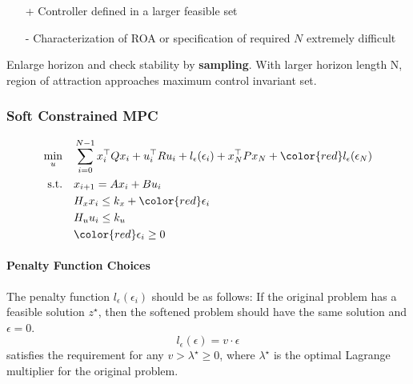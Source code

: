 \newpar{}

\begin{itemize}
    \item [+] Controller defined in a larger feasible set
    \item [-] Characterization of ROA or specification of required $N$ extremely difficult
\end{itemize}

\newpar{}

Enlarge horizon and check stability by \textbf{sampling}.
\newpar{}
With larger horizon length N, region of attraction approaches maximum control invariant set.

\subsubsection{Soft Constrained MPC}
\noindent
\begin{align*}
    \min_u \quad      & \sum_{i=0}^{N-1} x_i^\top Q x_i + u_i^\top R u_i + l_\epsilon(\epsilon_i) + x_N^\top P x_N + {\color{red}l_\epsilon(\epsilon_N)} \\
    \text{s.t.} \quad & x_{i+1} = A x_i + B u_i                                                                                                          \\
                      & H_x x_i \leq k_x + {\color{red}\epsilon_i}                                                                                       \\
                      & H_u u_i \leq k_u                                                                                                                 \\
                      & {\color{red}\epsilon_i \geq 0}
\end{align*}

\paragraph{Penalty Function Choices}
The penalty function $l_\epsilon(\epsilon_i)$ should be as follows: If the original problem has a feasible solution $z^\star$, then the softened problem should have the same solution and $\epsilon = 0$.
\newpar{}
\begin{equation*}
    l_\epsilon(\epsilon) = v \cdot \epsilon
\end{equation*}
satisfies the requirement for any $v > \lambda^\star \geq 0$, where $\lambda^\star$ is the optimal Lagrange multiplier for the original problem.
\newpar{}

